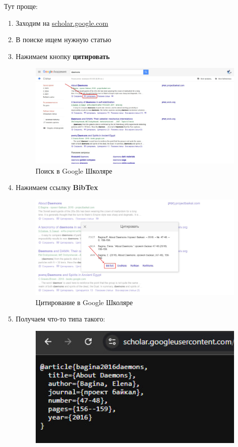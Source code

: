 Тут проще:
\begin{enumerate}
    \item Заходим на \href{https://scholar.google.com/}{scholar.google.com}
    \item В поиске ищем нужную статью
    \item Нажимаем кнопку \textbf{цитировать}
    \begin{figure}[H]
        \centering
        \includegraphics[width=150mm]{images/search}
        \caption{Поиск в Google Школяре}
        \label{fig:searhc}
    \end{figure}
    \item Нажимаем ссылку \textbf{BibTex}
    \begin{figure}[H]
        \centering
        \includegraphics[width=150mm]{images/quote}
        \caption{Цитирование в Google Школяре}
        \label{fig:quote}
    \end{figure}
    \item Получаем что-то типа такого:
    \begin{figure}[H]
        \centering
        \includegraphics[width=150mm]{images/bibtex}

\end{figure}
\end{enumerate}

